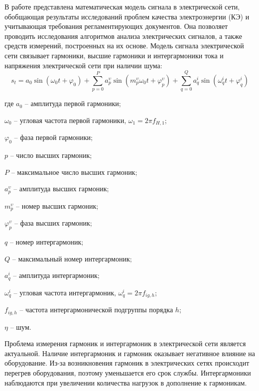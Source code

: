 В работе представлена математическая модель сигнала в электрической сети, обобщающая результаты исследований проблем качества электроэнергии (КЭ) и учитывающая требования регламентирующих документов. Она позволяет проводить исследования алгоритмов анализа электрических сигналов, а также средств измерений, построенных на их основе.
Модель сигнала электрической сети связывает гармоники, высшие гармоники и интергармоники тока и напряжения электрической сети при наличии шума: 
\begin{equation}
	\label{eq:equation1}
	s_{t} = a_{0} \sin (\omega_{0} t + \varphi_{0}) + \displaystyle\sum_{p=0}^{P} a_p^{\upsilon} \sin (m_p^{\upsilon} \omega_{0} t + \varphi_p^{\upsilon}) + \displaystyle\sum_{q=0}^{Q} a_q^i \sin  (\omega_q^i t + \varphi_q^{i})
\end{equation}

где $a_{0}$ – амплитуда первой гармоники;

$\omega_{0}$ – угловая частота первой гармоники, $\omega_{1} = 2 \pi f_{H,1}$;

$\varphi_{0}$ – фаза первой гармоники; 

$p$ – число высших гармоник;

$P$ – максимальное число высших гармоник;

$a_p^{\upsilon}$ – амплитуда высших гармоник;

$m_p^{\upsilon}$ – номер высших гармоник;

$\varphi_p^{\upsilon}$ – фаза высших гармоник;

$q$ – номер интергармоник;

$Q$ – максимальный номер интергармоник;

$a_q^i$ – амплитуда интергармоник;

$\omega_q^i$ – угловая частота интергармоник, $\omega_q^i=2\pi f_{ig,h}$; 

$f_{ig,h}$ – частота интергармонической подгруппы порядка $h$;

$\eta$ – шум.

Проблема измерения гармоник и интергармоник в электрической сети является актуальной.
Наличие интергармоник и гармоник оказывает негативное влияние на оборудование. Из-за возникновения гармоник в электрических сетях происходит перегрев оборудования, поэтому уменьшается его срок службы. Интергармоники наблюдаются при увеличении количества нагрузок в дополнение к гармоникам.

